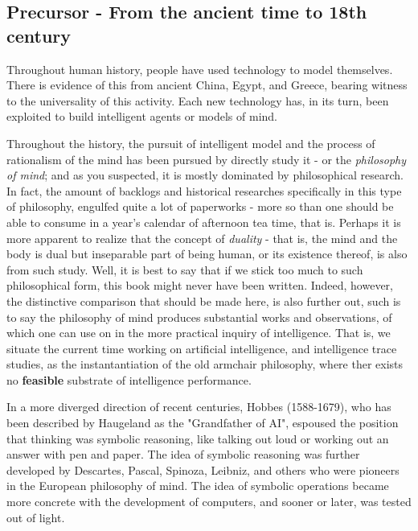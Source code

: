 \subsection{Precursor - From the ancient time to 18th century}

Throughout human history, people have used technology to model themselves. There is evidence of this from ancient China, Egypt, and Greece, bearing witness to the universality of this activity. Each new technology has, in its turn, been exploited to build intelligent agents or models of mind. 

Throughout the history, the pursuit of intelligent model and the process of rationalism of the mind has been pursued by directly study it - or the \textit{philosophy of mind}; and as you suspected, it is mostly dominated by philosophical research. In fact, the amount of backlogs and historical researches specifically in this type of philosophy, engulfed quite a lot of paperworks - more so than one should be able to consume in a year's calendar of afternoon tea time, that is. Perhaps it is more apparent to realize that the concept of \textit{duality} - that is, the mind and the body is dual but inseparable part of being human, or its existence thereof, is also from such study. Well, it is best to say that if we stick too much to such philosophical form, this book might never have been written. Indeed, however, the distinctive comparison that should be made here, is also further out, such is to say the philosophy of mind produces substantial works and observations, of which one can use on in the more practical inquiry of intelligence. That is, we situate the current time working on artificial intelligence, and intelligence trace studies, as the instantantiation of the old armchair philosophy, where ther exists no \textbf{feasible} substrate of intelligence performance. 

In a more diverged direction of recent centuries, Hobbes (1588-1679), who has been described by Haugeland as the "Grandfather of AI", espoused the position that thinking was symbolic reasoning, like talking out loud or working out an answer with pen and paper. The idea of symbolic reasoning was further developed by Descartes, Pascal, Spinoza, Leibniz, and others who were pioneers in the European philosophy of mind. The idea of symbolic operations became more concrete with the development of computers, and sooner or later, was tested out of light. 

